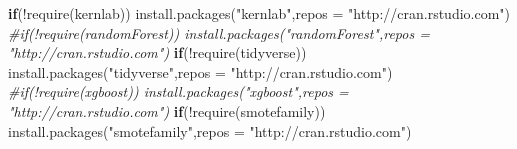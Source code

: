 \documentclass[12pt,twoside]{deuthesis}
\newenvironment{Shaded}{\begin{snugshade}}{\end{snugshade}}
\newcommand{\AttributeTok}[1]{\textcolor[rgb]{0.77,0.63,0.00}{#1}}
\newcommand{\CommentTok}[1]{\textcolor[rgb]{0.56,0.35,0.01}{\textit{#1}}}
\newcommand{\ControlFlowTok}[1]{\textcolor[rgb]{0.13,0.29,0.53}{\textbf{#1}}}
\newcommand{\FunctionTok}[1]{\textcolor[rgb]{0.00,0.00,0.00}{#1}}
\newcommand{\NormalTok}[1]{#1}
\newcommand{\SpecialCharTok}[1]{\textcolor[rgb]{0.00,0.00,0.00}{#1}}
\newcommand{\StringTok}[1]{\textcolor[rgb]{0.31,0.60,0.02}{#1}}
\begin{document}
\begin{Shaded}
\begin{Highlighting}[]
\ControlFlowTok{if}\NormalTok{(}\SpecialCharTok{!}\FunctionTok{require}\NormalTok{(kernlab))  }\FunctionTok{install.packages}\NormalTok{(}\StringTok{"kernlab"}\NormalTok{,}\AttributeTok{repos =} \StringTok{"http://cran.rstudio.com"}\NormalTok{)}
\CommentTok{\#if(!require(randomForest))  install.packages("randomForest",repos = "http://cran.rstudio.com")}
\ControlFlowTok{if}\NormalTok{(}\SpecialCharTok{!}\FunctionTok{require}\NormalTok{(tidyverse))  }\FunctionTok{install.packages}\NormalTok{(}\StringTok{"tidyverse"}\NormalTok{,}\AttributeTok{repos =} \StringTok{"http://cran.rstudio.com"}\NormalTok{)}
\CommentTok{\#if(!require(xgboost))  install.packages("xgboost",repos = "http://cran.rstudio.com")}
\ControlFlowTok{if}\NormalTok{(}\SpecialCharTok{!}\FunctionTok{require}\NormalTok{(smotefamily))  }\FunctionTok{install.packages}\NormalTok{(}\StringTok{"smotefamily"}\NormalTok{,}\AttributeTok{repos =} \StringTok{"http://cran.rstudio.com"}\NormalTok{)}
\end{Highlighting}
\end{Shaded}
\end{document}

